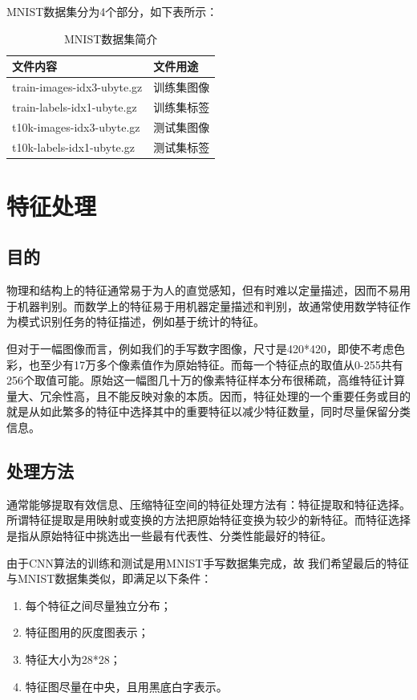 \documentclass[UTF8, a4paper, 12pt]{report}
\begin{document}
		MNIST数据集分为4个部分，如下表所示：
		\begin{table}[!h]
		\centering
		\caption{MNIST数据集简介}  
		\begin{tabular*}{9cm}{ll}  
		\hline  
		文件内容 & 文件用途 \\  
		\hline  
		\hline
		train-images-idx3-ubyte.gz  & 训练集图像 \\  
		train-labels-idx1-ubyte.gz  & 训练集标签 \\  
		t10k-images-idx3-ubyte.gz & 测试集图像\\
		t10k-labels-idx1-ubyte.gz & 测试集标签\\  
		\hline  
		\end{tabular*}  
		\end{table} 

	\section{特征处理}
		\subsection{目的}
			物理和结构上的特征通常易于为人的直觉感知，但有时难以定量描述，因而不易用于机器判别。而数学上的特征易于用机器定量描述和判别，故通常使用数学特征作为模式识别任务的特征描述，例如基于统计的特征。

			但对于一幅图像而言，例如我们的手写数字图像，尺寸是420*420，即使不考虑色彩，也至少有17万多个像素值作为原始特征。而每一个特征点的取值从0-255共有256个取值可能。原始这一幅图几十万的像素特征样本分布很稀疏，高维特征计算量大、冗余性高，且不能反映对象的本质。因而，特征处理的一个重要任务或目的就是从如此繁多的特征中选择其中的重要特征以减少特征数量，同时尽量保留分类信息。

		\subsection{处理方法}
			通常能够提取有效信息、压缩特征空间的特征处理方法有：特征提取和特征选择。所谓特征提取是用映射或变换的方法把原始特征变换为较少的新特征。而特征选择是指从原始特征中挑选出一些最有代表性、分类性能最好的特征。
		
			由于CNN算法的训练和测试是用MNIST手写数据集完成，故 我们希望最后的特征与MNIST数据集类似，即满足以下条件：
			\begin{enumerate}[itemindent=1em]
				\renewcommand{\labelenumi}{\theenumi)}
				\item 每个特征之间尽量独立分布；
				\item 特征图用的灰度图表示；
				\item 特征大小为28*28；
				\item 特征图尽量在中央，且用黑底白字表示。
			\end{enumerate}
\end{document}
